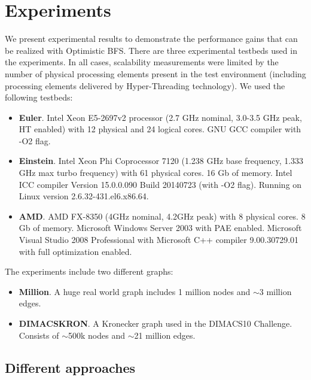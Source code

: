 \documentclass[letterpaper]{article}
\begin{document}
	
	
	\section{Experiments}\label{sec:expe} %
		We present experimental results to demonstrate the performance gains that can be realized with Optimistic BFS.
		There are three experimental testbeds used in the experiments. 
		In all cases, scalability measurements were limited by the number of physical processing elements present in the test environment (including processing elements delivered by Hyper-Threading technology).
		We used the following testbeds:
		\begin{itemize}
			\item \textbf{Euler}. Intel Xeon E5-2697v2 processor (2.7 GHz nominal, 3.0-3.5 GHz peak, HT enabled) with 12 physical and 24 logical cores. GNU GCC compiler with -O2 flag. 
			\item \textbf{Einstein}. Intel Xeon Phi Coprocessor 7120 (1.238 GHz base frequency, 1.333 GHz max turbo frequency) with 61 physical cores. 16 Gb of memory.
			Intel ICC compiler Version 15.0.0.090 Build 20140723 (with -O2 flag).
			Running on Linux version 2.6.32-431.el6.x86.64.
			

			\item \textbf{AMD}. AMD FX-8350 (4GHz nominal, 4.2GHz peak) with 8 physical cores. 8 Gb of memory. Microsoft Windows Server 2003 with PAE enabled. Microsoft Visual Studio 2008 Professional with  Microsoft C++ compiler 9.00.30729.01 with full optimization enabled.
		\end{itemize}
		The experiments include two different graphs:
		\begin{itemize}
			\item \textbf{Million}. A huge real world graph includes 1 million nodes and $\sim$3 million edges.
			\item \textbf{DIMACSKRON}. A Kronecker graph used in the DIMACS10 Challenge. Consists of $\sim$500k nodes and $\sim$21 million edges.
		\end{itemize}
		

		
		\subsection{Different approaches}\label{sec:approaches}
		
\end{document}
